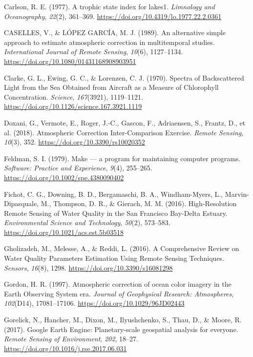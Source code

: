 \documentclass[]{article}
\begin{document}
\leavevmode\hypertarget{ref-Carlson1977}{}%
Carlson, R. E. (1977). A trophic state index for lakes1. \emph{Limnology
and Oceanography}, \emph{22}(2), 361--369.
\url{https://doi.org/10.4319/lo.1977.22.2.0361}

\leavevmode\hypertarget{ref-Caselles1989}{}%
CASELLES, V., \& LÓPEZ GARCÍA, M. J. (1989). An alternative simple
approach to estimate atmospheric correction in multitemporal studies.
\emph{International Journal of Remote Sensing}, \emph{10}(6),
1127--1134. \url{https://doi.org/10.1080/01431168908903951}

\leavevmode\hypertarget{ref-Clarke1970}{}%
Clarke, G. L., Ewing, G. C., \& Lorenzen, C. J. (1970). Spectra of
Backscattered Light from the Sea Obtained from Aircraft as a Measure of
Chlorophyll Concentration. \emph{Science}, \emph{167}(3921), 1119--1121.
\url{https://doi.org/10.1126/science.167.3921.1119}

\leavevmode\hypertarget{ref-Doxani2018}{}%
Doxani, G., Vermote, E., Roger, J.-C., Gascon, F., Adriaensen, S.,
Frantz, D., et al. (2018). Atmospheric Correction Inter-Comparison
Exercise. \emph{Remote Sensing}, \emph{10}(3), 352.
\url{https://doi.org/10.3390/rs10020352}

\leavevmode\hypertarget{ref-Feldman1979}{}%
Feldman, S. I. (1979). Make --- a program for maintaining computer
programs. \emph{Software: Practice and Experience}, \emph{9}(4),
255--265. \url{https://doi.org/10.1002/spe.4380090402}

\leavevmode\hypertarget{ref-Fichot2016}{}%
Fichot, C. G., Downing, B. D., Bergamaschi, B. A., Windham-Myers, L.,
Marvin-Dipasquale, M., Thompson, D. R., \& Gierach, M. M. (2016).
High-Resolution Remote Sensing of Water Quality in the San Francisco
Bay-Delta Estuary. \emph{Environmental Science and Technology},
\emph{50}(2), 573--583. \url{https://doi.org/10.1021/acs.est.5b03518}

\leavevmode\hypertarget{ref-Gholizadeh2016}{}%
Gholizadeh, M., Melesse, A., \& Reddi, L. (2016). A Comprehensive Review
on Water Quality Parameters Estimation Using Remote Sensing Techniques.
\emph{Sensors}, \emph{16}(8), 1298.
\url{https://doi.org/10.3390/s16081298}

\leavevmode\hypertarget{ref-Gordon1997}{}%
Gordon, H. R. (1997). Atmospheric correction of ocean color imagery in
the Earth Observing System era. \emph{Journal of Geophysical Research:
Atmospheres}, \emph{102}(D14), 17081--17106.
\url{https://doi.org/10.1029/96JD02443}

\leavevmode\hypertarget{ref-Gorelick2017}{}%
Gorelick, N., Hancher, M., Dixon, M., Ilyushchenko, S., Thau, D., \&
Moore, R. (2017). Google Earth Engine: Planetary-scale geospatial
analysis for everyone. \emph{Remote Sensing of Environment}, \emph{202},
18--27. \url{https://doi.org/10.1016/j.rse.2017.06.031}
\end{document}
